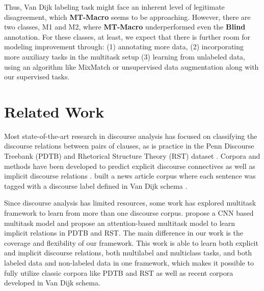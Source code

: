 \documentclass[11pt]{article}
\begin{document}
Thus, Van Dijk labeling task might face an inherent level of legitimate disagreement, which \textbf{MT-Macro} seems to be approaching. However, there are two classes, M1 and M2, where \textbf{MT-Macro} underperformed even the \textbf{Blind} annotation. For these classes, at least, we expect that there is further room for modeling improvement through: (1) annotating more data, (2) incorporating more auxiliary tasks in the multitask setup (3) learning from unlabeled data, using an algorithm like MixMatch \cite{mixmatch} or unsupervised data augmentation \cite{xie2019unsupervised} along with our supervised tasks.




\section{Related Work}

Most state-of-the-art research in discourse analysis has focused on classifying the discourse relations between pairs of clauses, as is practice in the Penn Discourse Treebank (PDTB) \cite{prasad2008penn} and Rhetorical Structure Theory (RST) dataset \cite{carlson2003building}. Corpora and methods have been developed to predict explicit discourse connectives \cite{miltsakaki-etal-2004-annotating,lin2009recognizing,das2018constructing,malmi2017automatic,wang-etal-2018-toward} as well as implicit discourse relations  \cite{rutherford2016robust,liu2016implicit,lan2017multi,lei2017swim}.  \citet{choubey-etal-2020-discourse} built a news article corpus where each sentence was tagged with a discourse label defined in Van Dijk schema \cite{van2013news}. 

Since discourse analysis has limited resources, some work has explored multitask framework to learn from more than one discourse corpus. \citet{liu2016implicit} propose a CNN based multitask model and \citet{lan2017multi} propose an attention-based multitask model to learn implicit relations in PDTB and RST. The main difference in our work is the coverage and flexibility of our framework. This work is able to learn both explicit and implicit discourse relations, both multilabel and multiclass tasks, and both labeled data and non-labeled data in one framework, which makes it possible to fully utilize classic corpora like PDTB and RST as well as recent corpora developed in Van Dijk schema.
\end{document}
